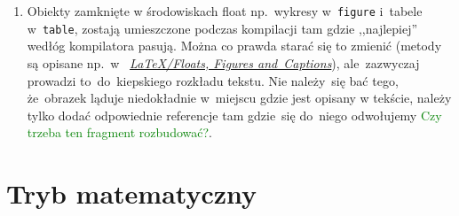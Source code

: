 \documentclass[a4paper,11pt]{article}
\newcommand{\toadd}[1]{\textcolor{green}{#1}}
\begin{document}
\begin{enumerate}
  Jeśli teraz \LaTeX{} stwierdzi, że~jest błąd w~jakimś miejscu
  tekstu, a~ty nie możesz znaleźć miejsca gdzie on~dokładnie jest
  (wskazania kompilatora~są często bardzo mało dokładne), proponujemy
  postępować w~następujący sposób. Zakomentuj możliwie mały blok
  tekstu wokół miejsca w~którym wskazany jest błąd, tak by~plik
  zaczął~się ponownie kompilować. Następnie odkomentowuj ten tekst
  porcjami do~momentu, aż~błąd pojawi~się znowu. Teraz już wiesz,
  że~musi być w~ostatnim odkomentowany fragmencie.

  Jeśli w~tym fragmencie dalej nie jesteś w~stanie go znaleźć, spróbuj
  powtórzyć opisaną wyżej procedurę na~nim. I~tak do momentu, aż~go
  znajdziesz. Życzymy powodzenia~\smiley.
\item Obiekty zamknięte w środowiskach float np.~wykresy
  w~\texttt{figure} i~tabele w~\texttt{table}, zostają umieszczone
  podczas kompilacji tam gdzie ,,najlepiej'' wedłóg kompilatora
  pasują. Można co prawda starać się to zmienić (metody są opisane
  np.~w~
  \href{https://en.wikibooks.org/wiki/LaTeX/Floats,\_Figures\_and\_Captions}{\emph{\LaTeX/Floats,
      Figures and~Captions}}), ale~zazwyczaj prowadzi to~do~kiepskiego
  rozkładu tekstu. Nie należy~się bać tego, że~obrazek ląduje
  niedokładnie w~miejscu gdzie jest opisany w tekście, należy tylko
  dodać odpowiednie referencje tam gdzie~się do~niego odwołujemy
  \toadd{Czy trzeba ten fragment rozbudować?}.
\end{enumerate}





\section{Tryb matematyczny}
\label{sec:trybmatematyczny}
\end{document}
